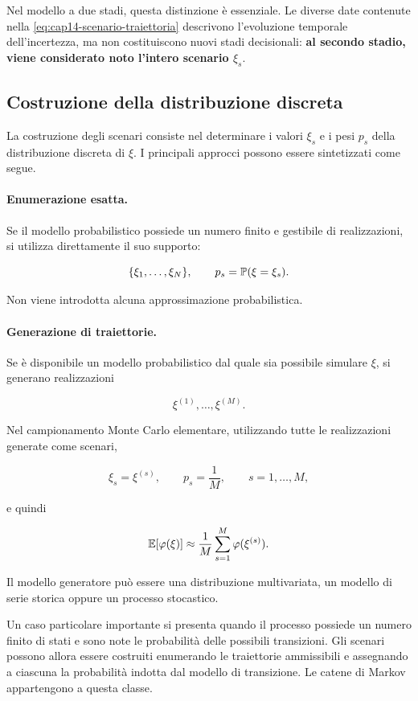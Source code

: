Nel modello a due stadi, questa distinzione \`e essenziale. Le diverse date
contenute nella \eqref{eq:cap14-scenario-traiettoria} descrivono
l'evoluzione temporale dell'incertezza, ma non costituiscono nuovi stadi
decisionali: \textbf{al secondo stadio, viene considerato noto l'intero scenario
$\xi_s$}.

\subsection{Costruzione della distribuzione discreta}

La costruzione degli scenari consiste nel determinare i valori $\xi_s$ e i
pesi $p_s$ della distribuzione discreta di $\xi$. I principali
approcci possono essere sintetizzati come segue.

\paragraph{Enumerazione esatta.}

Se il modello probabilistico possiede un numero finito e gestibile di
realizzazioni, si utilizza direttamente il suo supporto:

\[
\{\xi_1,\ldots,\xi_N\},
\qquad
p_s=\mathbb{P}(\xi=\xi_s).
\]

Non viene introdotta alcuna approssimazione probabilistica.

\paragraph{Generazione di traiettorie.}

Se \`e disponibile un modello probabilistico dal quale sia possibile
simulare $\xi$, si generano realizzazioni

\[
\xi^{(1)},\ldots,\xi^{(M)}.
\]

Nel campionamento Monte Carlo elementare, utilizzando tutte le realizzazioni
generate come scenari,

\[
\xi_s=\xi^{(s)},
\qquad
p_s=\frac{1}{M},
\qquad
s=1,\ldots,M,
\]

\noindent e quindi

\[
\mathbb{E}[\varphi(\xi)]
\approx
\frac{1}{M}
\sum_{s=1}^{M}\varphi(\xi^{(s)}).
\]

Il modello generatore pu\`o essere una distribuzione multivariata, un modello
di serie storica oppure un processo stocastico.

Un caso particolare importante si presenta quando il processo possiede un
numero finito di stati e sono note le probabilit\`a delle possibili
transizioni. Gli scenari possono allora essere costruiti enumerando le
traiettorie ammissibili e assegnando a ciascuna la probabilit\`a indotta dal
modello di transizione. Le catene di Markov appartengono a questa classe.

